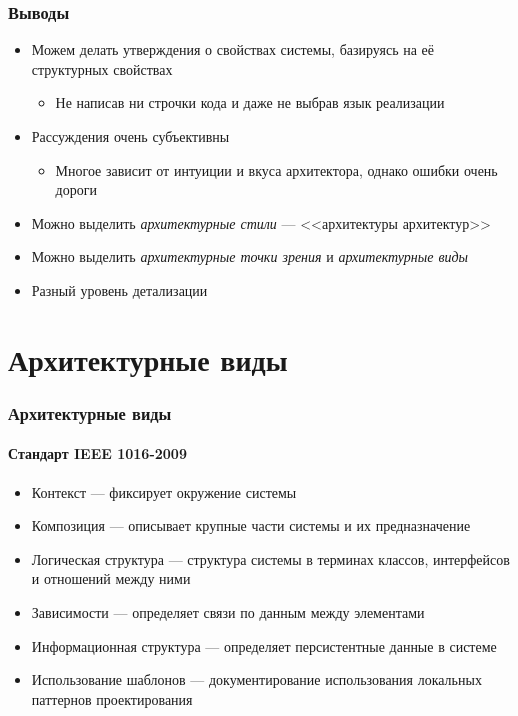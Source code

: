 \documentclass{../../slides-style}
\begin{document}
    \begin{frame}
        \frametitle{Выводы}
        \begin{itemize}
            \item Можем делать утверждения о свойствах системы, базируясь на её структурных свойствах
            \begin{itemize}
                \item Не написав ни строчки кода и даже не выбрав язык реализации
            \end{itemize}
            \item Рассуждения очень субъективны
            \begin{itemize}
                \item Многое зависит от интуиции и вкуса архитектора, однако ошибки очень дороги
            \end{itemize}
            \item Можно выделить \emph{архитектурные стили} --- <<архитектуры архитектур>>
            \item Можно выделить \emph{архитектурные точки зрения} и \emph{архитектурные виды}
            \item Разный уровень детализации
        \end{itemize}
    \end{frame}

    \section{Архитектурные виды}

    \begin{frame}
        \frametitle{Архитектурные виды}
        \framesubtitle{Стандарт IEEE 1016-2009}
        \begin{itemize}
            \item Контекст --- фиксирует окружение системы
            \item Композиция --- описывает крупные части системы и их предназначение
            \item Логическая структура --- структура системы в терминах классов, интерфейсов и отношений между ними
            \item Зависимости --- определяет связи по данным между элементами
            \item Информационная структура --- определяет персистентные данные в системе
            \item Использование шаблонов --- документирование использования локальных паттернов проектирования
        \end{itemize}
    \end{frame}
\end{document}
